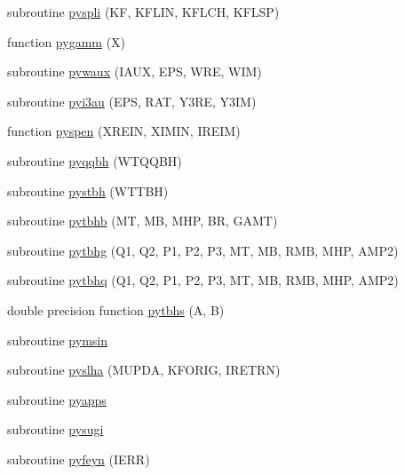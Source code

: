 \begin{DoxyCompactItemize}
\item 
subroutine \hyperlink{pythia-6_84_824_8f_aab7673bb913ff8040b3daca173253fd3}{pyspli} (K\+F, K\+F\+L\+I\+N, K\+F\+L\+C\+H, K\+F\+L\+S\+P)
\item 
function \hyperlink{pythia-6_84_824_8f_a06d78ee8406e4a1ebe6e3704ba3d4ee0}{pygamm} (X)
\item 
subroutine \hyperlink{pythia-6_84_824_8f_ae73ad40757f6c2497e6197d50a19901e}{pywaux} (I\+A\+U\+X, E\+P\+S, W\+R\+E, W\+I\+M)
\item 
subroutine \hyperlink{pythia-6_84_824_8f_ac186b931cca6ec24614b06ac135af2f1}{pyi3au} (E\+P\+S, R\+A\+T, Y3\+R\+E, Y3\+I\+M)
\item 
function \hyperlink{pythia-6_84_824_8f_a07b33954bdfe77b2cd3634a4c6fbd989}{pyspen} (X\+R\+E\+I\+N, X\+I\+M\+I\+N, I\+R\+E\+I\+M)
\item 
subroutine \hyperlink{pythia-6_84_824_8f_a958f5064a30376ef7cc637b527bd2a32}{pyqqbh} (W\+T\+Q\+Q\+B\+H)
\item 
subroutine \hyperlink{pythia-6_84_824_8f_a8e204cdd8fb7ba8d843c00f6da2ec7e9}{pystbh} (W\+T\+T\+B\+H)
\item 
subroutine \hyperlink{pythia-6_84_824_8f_af4c86fb70caec2eba026ee2c81af861f}{pytbhb} (M\+T, M\+B, M\+H\+P, B\+R, G\+A\+M\+T)
\item 
subroutine \hyperlink{pythia-6_84_824_8f_ab37c75f11d388ab995e98e3eca29e81b}{pytbhg} (Q1, Q2, P1, P2, P3, M\+T, M\+B, R\+M\+B, M\+H\+P, A\+M\+P2)
\item 
subroutine \hyperlink{pythia-6_84_824_8f_a8d44a8d8b3450950fbf946b1c29fb42d}{pytbhq} (Q1, Q2, P1, P2, P3, M\+T, M\+B, R\+M\+B, M\+H\+P, A\+M\+P2)
\item 
double precision function \hyperlink{pythia-6_84_824_8f_a3fdb9651ba9fba9a91b74a416c48747b}{pytbhs} (A, B)
\item 
subroutine \hyperlink{pythia-6_84_824_8f_a27a2354cb3c8dc0f2fd65bc366f1cad9}{pymsin}
\item 
subroutine \hyperlink{pythia-6_84_824_8f_a424b8829609278da2e93ca1bc93b36be}{pyslha} (M\+U\+P\+D\+A, K\+F\+O\+R\+I\+G, I\+R\+E\+T\+R\+N)
\item 
subroutine \hyperlink{pythia-6_84_824_8f_a1420c8865333d41abeeecac9eb84d5ad}{pyapps}
\item 
subroutine \hyperlink{pythia-6_84_824_8f_ae48eb2702adff3d4d4b56689fde89d3c}{pysugi}
\item 
subroutine \hyperlink{pythia-6_84_824_8f_aa5b7f6282512d1ea3619a2d6061c68ce}{pyfeyn} (I\+E\+R\+R)
\item 

\end{DoxyCompactItemize}
